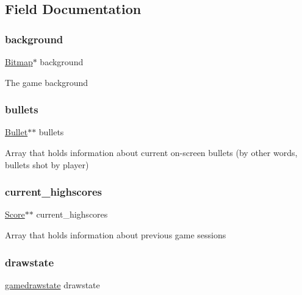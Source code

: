\subsection{Field Documentation}
\hypertarget{struct_game_a15de70574bc710486bf129a5c8f1634e}{}\label{struct_game_a15de70574bc710486bf129a5c8f1634e} 
\subsubsection{\texorpdfstring{background}{background}}
{\footnotesize\ttfamily \hyperlink{struct_bitmap}{Bitmap}$\ast$ background}

The game background \hypertarget{struct_game_a6a95913dbac873584311bd479b43f911}{}\label{struct_game_a6a95913dbac873584311bd479b43f911} 
\subsubsection{\texorpdfstring{bullets}{bullets}}
{\footnotesize\ttfamily \hyperlink{struct_bullet}{Bullet}$\ast$$\ast$ bullets}

Array that holds information about current on-\/screen bullets (by other words, bullets shot by player) \hypertarget{struct_game_a544b8de55d5dc1667fad656b245d4a5a}{}\label{struct_game_a544b8de55d5dc1667fad656b245d4a5a} 
\subsubsection{\texorpdfstring{current\+\_\+highscores}{current\_highscores}}
{\footnotesize\ttfamily \hyperlink{struct_score}{Score}$\ast$$\ast$ current\+\_\+highscores}

Array that holds information about previous game sessions \hypertarget{struct_game_ab151fa4f58b0ddc30af7e501f6ba2ec3}{}\label{struct_game_ab151fa4f58b0ddc30af7e501f6ba2ec3} 
\subsubsection{\texorpdfstring{drawstate}{drawstate}}
{\footnotesize\ttfamily \hyperlink{group__game_gab1e4078b5fa77cbf79de5e160f4cb261}{gamedrawstate} drawstate}

